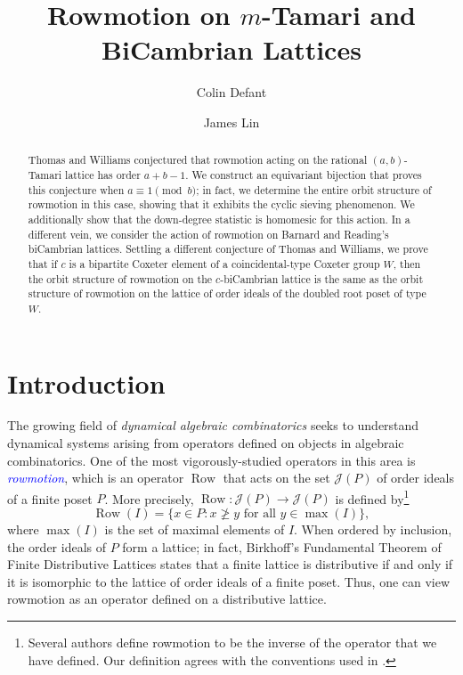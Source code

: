 \documentclass[11pt]{amsart}
\theoremstyle{definition}
\DeclareMathOperator{\row}{Row}
\newcommand{\dfn}[1]{\textcolor{blue}{\emph{#1}}}
\begin{document}
\title[]{Rowmotion on $m$-Tamari and BiCambrian Lattices}
\subjclass[2010]{}


\author[]{Colin Defant}
\address[]{Department of Mathematics, Harvard University, Cambridge, MA 02139, USA}
\author[]{James Lin}
\address[]{Department of Mathematics and Computer Science, Massachusetts Institute of Technology, Cambridge, MA 02139, USA}


\begin{abstract}
Thomas and Williams conjectured that rowmotion acting on the rational $(a,b)$-Tamari lattice has order $a+b-1$. We construct an equivariant bijection that proves this conjecture when $a\equiv 1\pmod b$; in fact, we determine the entire orbit structure of rowmotion in this case, showing that it exhibits the cyclic sieving phenomenon. We additionally show that the down-degree statistic is homomesic for this action. In a different vein, we consider the action of rowmotion on Barnard and Reading's biCambrian lattices. Settling a different conjecture of Thomas and Williams, we prove that if $c$ is a bipartite Coxeter element of a coincidental-type Coxeter group $W$, then the orbit structure of rowmotion on the $c$-biCambrian lattice is the same as the orbit structure of rowmotion on the lattice of order ideals of the doubled root poset of type $W$. 
\end{abstract}

\maketitle

\bigskip

\section{Introduction}\label{Sec:Intro} 

The growing field of \emph{dynamical algebraic combinatorics} seeks to understand dynamical systems arising from operators defined on objects in algebraic combinatorics. One of the most vigorously-studied operators in this area is \dfn{rowmotion}, which is an operator $\row$ that acts on the set $\mathcal J(P)$ of order ideals of a finite poset $P$. More precisely, $\row\colon \mathcal J(P)\to\mathcal J(P)$ is defined by\footnote{Several authors define rowmotion to be the inverse of the operator that we have defined. Our definition agrees with the conventions used in \cite{Barnard, Semidistrim, ThomasWilliams}.} \[\row(I)=\{x\in P:x\not\geq y\text{ for all }y\in\max(I)\},\] where $\max(I)$ is the set of maximal elements of $I$. When ordered by inclusion, the order ideals of $P$ form a lattice; in fact, Birkhoff's Fundamental Theorem of Finite Distributive Lattices \cite{Birkhoff} states that a finite lattice is distributive if and only if it is isomorphic to the lattice of order ideals of a finite poset. Thus, one can view rowmotion as an operator defined on a distributive lattice. 
\end{document}
